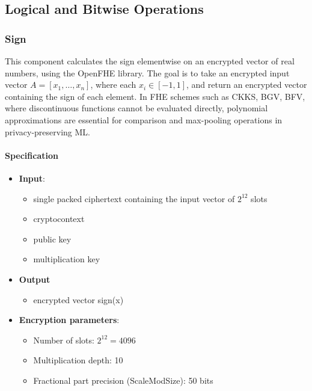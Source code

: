 \documentclass[article]{iacrtrans}
\begin{document}
\label{components}
\label{sec:component_list}
\subsection{Logical and Bitwise Operations}
\subsubsection{Sign}
This component calculates the sign elementwise on an encrypted vector of real numbers, using the OpenFHE library. The goal is to take an encrypted input vector $A = [x_1, \ldots, x_n]$, where each $x_i \in [-1, 1]$, and return an encrypted vector containing the sign of each element. In FHE schemes such as CKKS\cite{ckks:2016/421}, BGV\cite{bgv:2011/277}, BFV\cite{bfv:2012/144}, where discontinuous functions cannot be evaluated directly, polynomial approximations are essential for comparison and max-pooling operations in privacy-preserving ML. 

\paragraph{Specification}

 \begin{itemize}
    \item \textbf{Input}: 
        \begin{itemize}
            \item single packed ciphertext containing the input vector of $2^{12}$ slots
            \item cryptocontext
            \item public key
            \item multiplication key
        \end{itemize}
    \item \textbf{Output}
        \begin{itemize}
            \item encrypted vector sign(x)
        \end{itemize}
    \item \textbf{Encryption parameters}:
        \begin{itemize}
            \item Number of slots: $2^{12}=4096$ 
            \item Multiplication depth: 10
            \item Fractional part precision (ScaleModSize): 50 bits
        \end{itemize}

\end{itemize}
\end{document}

